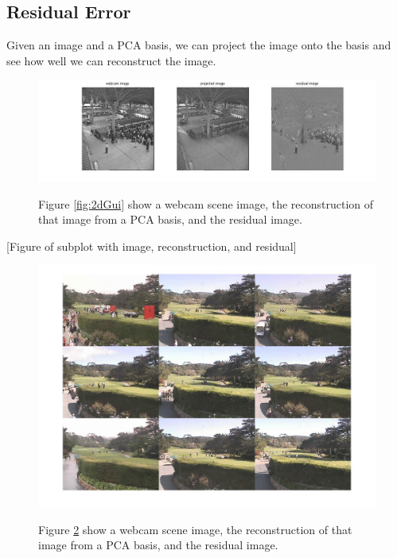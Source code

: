 \subsection{Residual Error}

Given an image and a PCA basis, we can project the image onto the basis and see how well we can reconstruct the image.

\begin{figure}
	\centering
		\includegraphics[width=1\textwidth]{figures/residualReconstruction.jpg}
	\label{fig:residualReconstruction}
	
		\caption[Residual Reconstruction.]{Figure \ref{fig:2dGui} show a webcam scene image, the reconstruction of that image from a PCA basis, and the residual image.}
\end{figure}

[Figure of subplot with image, reconstruction, and residual]

\begin{figure}
	\centering
		\includegraphics[width=1\textwidth]{figures/residualSSDmontage.jpg}
	\label{fig:residualSSDmontage}
	
		\caption[Residual SSD Montage.]{Figure \ref{fig:residualSSDmontage} show a webcam scene image, the reconstruction of that image from a PCA basis, and the residual image.}
\end{figure}

